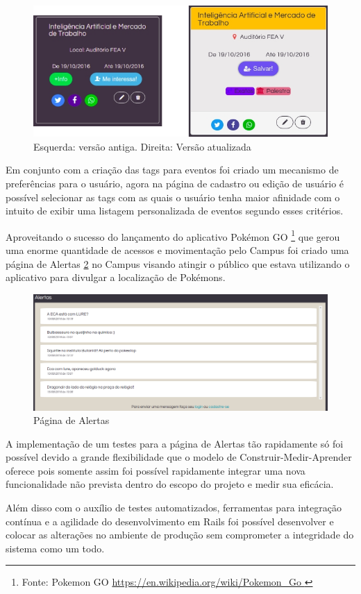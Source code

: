        \begin{figure}[htb]
        \centering
		\includegraphics[width=15cm]{figuras/thumbs_comparison_v1_v2}
		\caption{\label{fig:thumbs_comparison_v1_v2} Esquerda: versão antiga. Direita: Versão atualizada}
		\end{figure}

\par Em conjunto com a criação das tags para eventos foi criado um mecanismo de preferências para o usuário, agora na página de cadastro ou edição de usuário é possível selecionar as tags com as quais o usuário tenha maior afinidade com o intuito de exibir uma listagem personalizada de eventos segundo esses critérios.
\par Aproveitando o sucesso do lançamento do aplicativo Pokémon GO \footnote{Fonte: Pokemon GO \url{ https://en.wikipedia.org/wiki/Pokemon_Go }} que gerou uma enorme quantidade de acessos e movimentação pelo Campus foi criado uma página de Alertas \ref{fig:alert_page} no Campus visando atingir o público que estava utilizando o aplicativo para divulgar a localização de Pokémons.
\begin{figure}[htb]
\centering
\includegraphics[width=15cm]{figuras/alert_page}
\caption{\label{fig:alert_page} Página de Alertas}
\end{figure}
\par A implementação de um testes para a página de Alertas tão rapidamente só foi possível devido a grande flexibilidade que o modelo de Construir-Medir-Aprender oferece pois somente assim foi possível rapidamente integrar uma nova funcionalidade não prevista dentro do escopo do projeto e medir sua eficácia.
\par Além disso com o auxílio de testes automatizados, ferramentas para integração contínua e a agilidade do desenvolvimento em Rails foi possível desenvolver e colocar as alterações no ambiente de produção sem comprometer a integridade do sistema como um todo.

